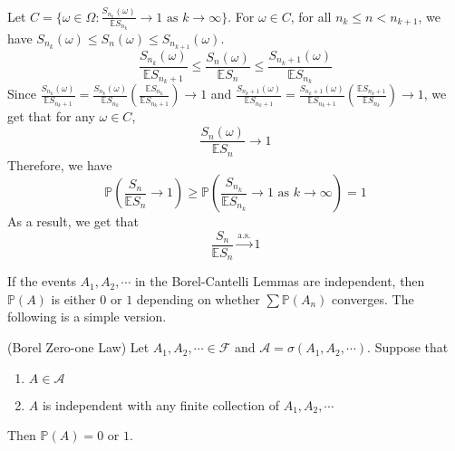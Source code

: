 \documentclass{huhtakm-template-book}
\newcommand{\prob}{\mathbb{P}}
\newcommand{\expect}{\mathbb{E}}
\begin{document}
\begin{proofing}
\begin{align*}
        \end{align*}
        Let $C=\{\omega\in\Omega:\frac{S_{n_{k}}(\omega)}{\expect S_{n_{k}}}\to 1\text{ as }k\to\infty\}$. For $\omega\in C$, for all $n_{k}\leq n<n_{k+1}$, we have $S_{n_{k}}(\omega)\leq S_{n}(\omega)\leq S_{n_{k+1}}(\omega)$.
        \begin{equation*}
            \frac{S_{n_{k}}(\omega)}{\expect S_{n_{k}+1}}\leq\frac{S_{n}(\omega)}{\expect S_{n}}\leq\frac{S_{n_{k}+1}(\omega)}{\expect S_{n_{k}}}
        \end{equation*}
        Since $\frac{S_{n_{k}}(\omega)}{\expect S_{n_{k}+1}}=\frac{S_{n_{k}}(\omega)}{\expect S_{n_{k}}}\left(\frac{\expect S_{n_{k}}}{\expect S_{n_{k}+1}}\right)\to 1$ and $\frac{S_{n_{k}+1}(\omega)}{\expect S_{n_{k}+1}}=\frac{S_{n_{k}+1}(\omega)}{\expect S_{n_{k}+1}}\left(\frac{\expect S_{n_{k}+1}}{\expect S_{n_{k}}}\right)\to 1$, we get that for any $\omega\in C$,
        \begin{equation*}
            \frac{S_{n}(\omega)}{\expect S_{n}}\to 1
        \end{equation*}
        Therefore, we have
        \begin{equation*}
            \prob\left(\frac{S_{n}}{\expect S_{n}}\to 1\right)\geq\prob\left(\frac{S_{n_{k}}}{\expect S_{n_{k}}}\to 1\text{ as }k\to\infty\right)=1
        \end{equation*}
        As a result, we get that
        \begin{equation*}
            \frac{S_{n}}{\expect S_{n}}\xrightarrow{\text{a.s.}}1
        \end{equation*}
    \end{proofing}
    If the events $A_{1}, A_{2},\cdots$ in the Borel-Cantelli Lemmas are independent, then $\prob(A)$ is either $0$ or $1$ depending on whether $\sum\prob(A_{n})$ converges. The following is a simple version.
    \begin{thm}(Borel Zero-one Law)
        Let $A_{1},A_{2},\cdots\in\mathcal{F}$ and $\mathcal{A}=\sigma(A_{1},A_{2},\cdots)$. Suppose that
        \begin{enumerate}
            \item $A\in\mathcal{A}$
            \item $A$ is independent with any finite collection of $A_{1},A_{2},\cdots$
        \end{enumerate}
        Then $\prob(A)=0$ or $1$.
    \end{thm}
\end{document}
